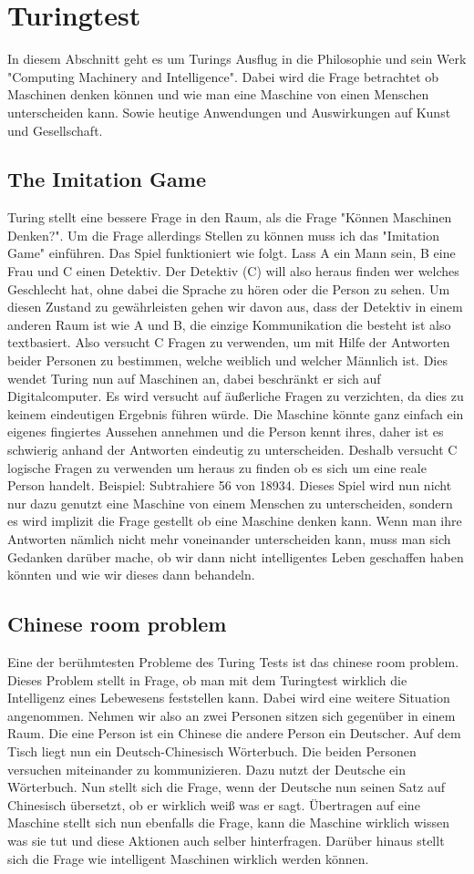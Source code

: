 \section{Turingtest}
In diesem Abschnitt geht es um Turings Ausflug in die Philosophie und sein Werk "Computing Machinery and Intelligence". Dabei wird die Frage betrachtet ob Maschinen denken können und wie man eine Maschine von einen Menschen unterscheiden kann. Sowie heutige Anwendungen und Auswirkungen auf Kunst und Gesellschaft.
\subsection{The Imitation Game}
Turing stellt eine bessere Frage in den Raum, als die Frage "Können Maschinen Denken?". Um die Frage allerdings Stellen zu können muss ich das "Imitation Game" einführen. Das Spiel funktioniert wie folgt. Lass A ein Mann sein, B eine Frau und C einen Detektiv. Der Detektiv (C) will also heraus finden wer welches Geschlecht hat, ohne dabei die Sprache zu hören oder die Person zu sehen. Um diesen Zustand zu gewährleisten gehen wir davon aus, dass der Detektiv in einem anderen Raum ist wie A und B, die einzige Kommunikation die besteht ist also textbasiert. Also versucht C Fragen zu verwenden, um mit Hilfe der Antworten beider Personen zu bestimmen, welche weiblich und welcher Männlich ist. Dies wendet Turing nun auf Maschinen an, dabei beschränkt er sich auf Digitalcomputer. Es wird versucht auf äußerliche Fragen zu verzichten, da dies zu keinem eindeutigen Ergebnis führen würde. Die Maschine könnte ganz einfach ein eigenes fingiertes Aussehen annehmen und die Person kennt ihres, daher ist es schwierig anhand der Antworten eindeutig zu unterscheiden. Deshalb versucht C logische Fragen zu verwenden um heraus zu finden ob es sich um eine reale Person handelt. Beispiel: Subtrahiere 56 von 18934.\cite{computing} Dieses Spiel wird nun nicht nur dazu genutzt eine Maschine von einem Menschen zu unterscheiden, sondern es wird implizit die Frage gestellt ob eine Maschine denken kann. Wenn man ihre Antworten nämlich nicht mehr voneinander unterscheiden kann, muss man sich Gedanken darüber mache,  ob wir dann nicht intelligentes Leben geschaffen haben könnten und wie wir dieses dann behandeln.
\subsection{Chinese room problem}
Eine der berühmtesten Probleme des Turing Tests ist das chinese room problem. Dieses Problem stellt in Frage, ob man mit dem Turingtest wirklich die Intelligenz eines Lebewesens feststellen kann. Dabei wird eine weitere Situation angenommen. Nehmen wir also an zwei Personen sitzen sich gegenüber in einem Raum. Die eine Person ist ein Chinese die andere Person ein Deutscher. Auf dem Tisch liegt nun ein Deutsch-Chinesisch Wörterbuch. Die beiden Personen versuchen miteinander zu kommunizieren. Dazu nutzt der Deutsche ein Wörterbuch. Nun stellt sich die Frage, wenn der Deutsche nun seinen Satz auf Chinesisch übersetzt, ob er wirklich weiß was er sagt. Übertragen auf eine Maschine stellt sich nun ebenfalls die Frage, kann die Maschine wirklich wissen was sie tut und diese Aktionen auch selber hinterfragen. Darüber hinaus stellt sich die Frage wie intelligent Maschinen wirklich werden können.
